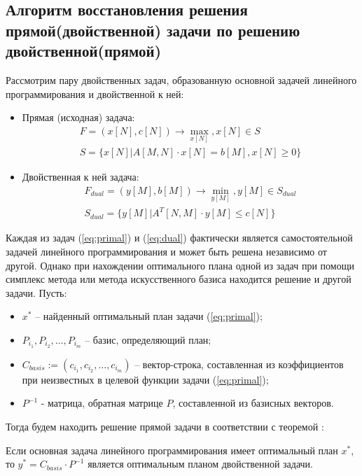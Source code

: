 \documentclass[main.tex]{subfiles}
\begin{document}
\subsection {Алгоритм восстановления решения прямой(двойственной) задачи по решению двойственной(прямой)}
Рассмотрим пару двойственных задач, образованную основной задачей линейного программирования и двойственной к ней:
\begin{itemize}
	\item Прямая (исходная) задача:
	\begin{equation}\label{eq:primal}
	\begin{array}{ll}
	F = (x[N],c[N])\longrightarrow \max_{x[N]}, x[N] \in S\\
	S =\{x[N]|A[M,N]\cdot x[N] = b[M], x[N] \ge 0\}
	\end{array}
	\end{equation}
	\item Двойственная к ней  задача:
	\begin{equation}\label{eq:dual}
	\begin{array}{ll}
	F_{dual} = (y[M],b[M])\longrightarrow \min_{y[M]}, y[M] \in S_{dual}\\
	S_{dual} =\{y[M]|A^{T}[N,M]\cdot y[M] \le c[N]\}
	\end{array}
	\end{equation}
\end{itemize}
Каждая из задач (\ref{eq:primal}) и (\ref{eq:dual}) фактически является самостоятельной задачей линейного программирования и может быть решена независимо от другой. Однако при нахождении оптимального плана одной из задач при помощи симплекс метода или метода искусственного базиса находится решение и другой задачи.
\newline Пусть: \begin{itemize}
	\item $x^{*}$ -- найденный оптимальный план  задачи (\ref{eq:primal});
	\item $P_{i_1}, P_{i_2}, \ldots, P_{i_m}$ -- базис, определяющий план; \item $C_{basis} := (c_{i_1}, c_{i_2}, \ldots, c_{i_m})$ -- вектор-строка, составленная из коэффициентов при неизвестных в целевой функции задачи (\ref{eq:primal});
	\item $P^{-1}$ - матрица, обратная матрице $P$, составленной из базисных векторов.
	\end{itemize}
Тогда будем находить решение прямой задачи в соответствии с теоремой \cite{akulich}: \begin{theorem}Если основная задача линейного программирования имеет оптимальный план $x^{*}$, то $y^{*} = C_{basis}\cdot P^{-1}$ является оптимальным планом двойственной задачи.\end{theorem}
\end{document}
